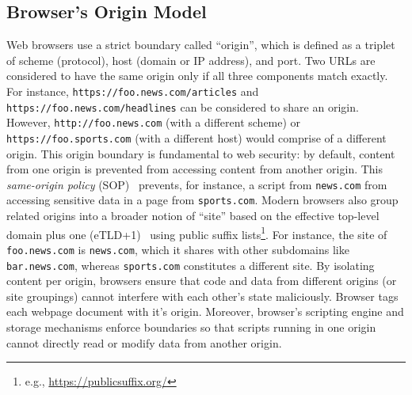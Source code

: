 \subsection{Browser's Origin Model}
%
Web browsers use a strict boundary called ``origin'', which is defined as a triplet of scheme (protocol), host (domain or IP address), and port.
%
Two URLs are considered to have the same origin only if all three components match exactly.
%
For instance, \texttt{https://foo.news.com/articles} and \texttt{https://foo.news.com/headlines} can be considered to share an origin.
%
However, \texttt{http://foo.news.com} (with a different scheme) or \texttt{https://foo.sports.com} (with a different host) would comprise of a different origin.
%
This origin boundary is fundamental to web security: by default, content from one origin is prevented from accessing content from another origin.
%
This \textit{same-origin policy} (SOP)~\cite{mdnSameoriginPolicySecurity2024} prevents, for instance, a script from \texttt{news.com} from accessing sensitive data in a page from \texttt{sports.com}.
%
Modern browsers also group related origins into a broader notion of ``site'' based on the effective top-level domain plus one (eTLD+1)~\cite{TrackingPreventionWebKit2020} using public suffix lists\footnote{e.g., \url{https://publicsuffix.org/}}.
%
For instance, the site of \texttt{foo.news.com} is \texttt{news.com}, which it shares with other subdomains like \texttt{bar.news.com}, whereas \texttt{sports.com} constitutes a different site.
%
By isolating content per origin, browsers ensure that code and data from different origins (or site groupings) cannot interfere with each other’s state maliciously.
%
%
Browser tags each webpage document with it's origin.
%
Moreover, browser’s scripting engine and storage mechanisms enforce boundaries so that scripts running in one origin cannot directly read or modify data from another origin.

